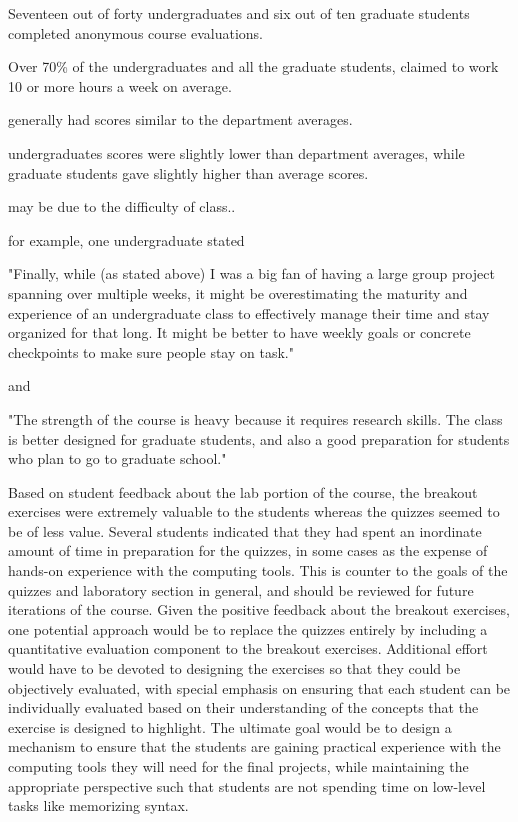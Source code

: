 Seventeen out of forty undergraduates and
six out of ten graduate students completed anonymous course evaluations.

Over 70\% of the undergraduates and all the graduate students, claimed to work
10 or more hours a week on average.

generally had scores similar to the department averages.

undergraduates scores were slightly lower than department averages,
while graduate students gave slightly higher than average scores.

may be due to the difficulty of class..

for example, one undergraduate stated

"Finally, while (as stated above) I was a big fan of having a large group
project spanning over multiple weeks, it might be overestimating the maturity
and experience of an undergraduate class to effectively manage their time and
stay organized for that long. It might be better to have weekly goals or
concrete checkpoints to make sure people stay on task."

and

"The strength of the course is heavy because it requires research skills. The
class is better designed for graduate students, and also a good preparation for
students who plan to go to graduate school."

Based on student feedback about the lab portion of the course, the breakout
exercises were extremely valuable to the students whereas the quizzes seemed
to be of less value.
Several students indicated that they had spent an inordinate amount of time in
preparation for the quizzes, in some cases as the expense of hands-on
experience with the computing tools.
This is counter to the goals of the quizzes and laboratory section in general,
and should be reviewed for future iterations of the course.
Given the positive feedback about the breakout exercises, one potential 
approach would be to replace the quizzes entirely by including a quantitative
evaluation component to the breakout exercises.
Additional effort would have to be devoted to designing the exercises so that
they could be objectively evaluated, with special emphasis on ensuring that
each student can be individually evaluated based on their understanding of the
concepts that the exercise is designed to highlight.
The ultimate goal would be to design a mechanism to ensure that the students
are gaining practical experience with the computing tools they will need for 
the final projects, while maintaining the appropriate perspective such that
students are not spending time on low-level tasks like memorizing syntax.



